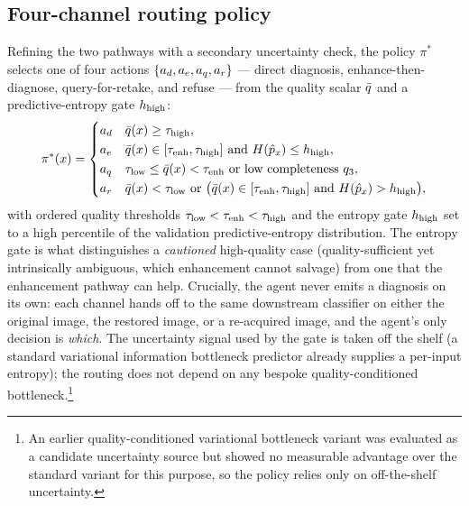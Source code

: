 \subsection{Four-channel routing policy}\label{sec:agent-routing}
Refining the two pathways with a secondary uncertainty check, the policy $\pi^{*}$ selects one of
four actions $\{a_d,a_e,a_q,a_r\}$ --- direct diagnosis, enhance-then-diagnose,
query-for-retake, and refuse --- from the quality scalar $\bar{q}$ and a predictive-entropy gate
$h_{\mathrm{high}}$:
\begin{equation}
\pi^{*}(x)=
\begin{cases}
\actd & \qbar(x)\geq\tauhigh,\\[1pt]
\acte & \qbar(x)\in[\tauenh,\tauhigh]\ \text{and}\ \Hent(\hat{p}_x)\leq\hhigh,\\[1pt]
\actq & \taulow\leq\qbar(x)<\tauenh\ \text{or}\ \text{low completeness } q_3,\\[1pt]
\actr & \qbar(x)<\taulow\ \text{or}\ \big(\qbar(x)\in[\tauenh,\tauhigh]\ \text{and}\ \Hent(\hat{p}_x)>\hhigh\big),
\end{cases}
\label{eq:agent-policy-body}
\end{equation}
with ordered quality thresholds $\tau_{\mathrm{low}}<\tau_{\mathrm{enh}}<\tau_{\mathrm{high}}$ and the entropy gate $h_{\mathrm{high}}$ set to a
high percentile of the validation predictive-entropy distribution. The entropy gate is what
distinguishes a \emph{cautioned} high-quality case (quality-sufficient yet intrinsically ambiguous,
which enhancement cannot salvage) from one that the enhancement pathway can help. Crucially, the
agent never emits a diagnosis on its own: each channel hands off to the same downstream classifier
on either the original image, the restored image, or a re-acquired image, and the agent's only
decision is \emph{which}. The uncertainty signal used by the gate is taken off the shelf (a standard
variational information bottleneck predictor already supplies a per-input entropy); the routing does
not depend on any bespoke quality-conditioned bottleneck.\footnote{An earlier
quality-conditioned variational bottleneck variant was evaluated as a candidate uncertainty source
but showed no measurable advantage over the standard variant for this purpose, so the policy relies
only on off-the-shelf uncertainty.}

